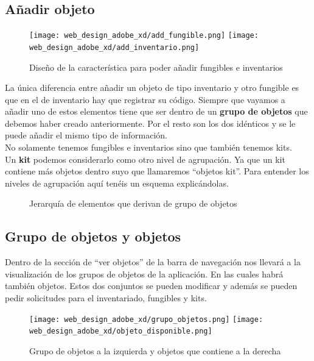 \subsection{Añadir objeto}

\begin{figure}[H]
    \begin{center}
        \texttt{[image: web\_design\_adobe\_xd/add\_fungible.png]}
        \texttt{[image: web\_design\_adobe\_xd/add\_inventario.png]}
        \caption{Diseño de la característica para poder añadir fungibles e inventarios}
    \end{center}
\end{figure}

La única diferencia entre añadir un objeto de tipo inventario y otro fungible es que en el de inventario hay que registrar su código. Siempre que vayamos a añadir uno de estos elementos tiene que ser dentro de un \textbf{grupo de objetos} que debemos haber creado anteriormente. Por el resto son los dos idénticos y se le puede añadir el mismo tipo de información.
\\No solamente tenemos fungibles e inventarios sino que también tenemos kits.
\\Un \textbf{kit} podemos considerarlo como otro nivel de agrupación. Ya que un kit contiene más objetos dentro suyo que llamaremos ``objetos kit''. Para entender los niveles de agrupación aquí tenéis un esquema explicándolas.

\begin{figure}[H]
    \caption{Jerarquía de elementos que derivan de grupo de objetos}
\end{figure}

\subsection{Grupo de objetos y objetos}

Dentro de la sección de ``ver objetos'' de la barra de navegación nos llevará a la visualización de los grupos de objetos de la aplicación. En las cuales habrá también objetos. Estos dos conjuntos se pueden modificar y además se pueden pedir solicitudes para el inventariado, fungibles y kits.

\begin{figure}[htbp]
    \centering
        \texttt{[image: web\_design\_adobe\_xd/grupo\_objetos.png]}
        \texttt{[image: web\_design\_adobe\_xd/objeto\_disponible.png]}
        \caption{Grupo de objetos a la izquierda y objetos que contiene a la derecha}
\end{figure}

